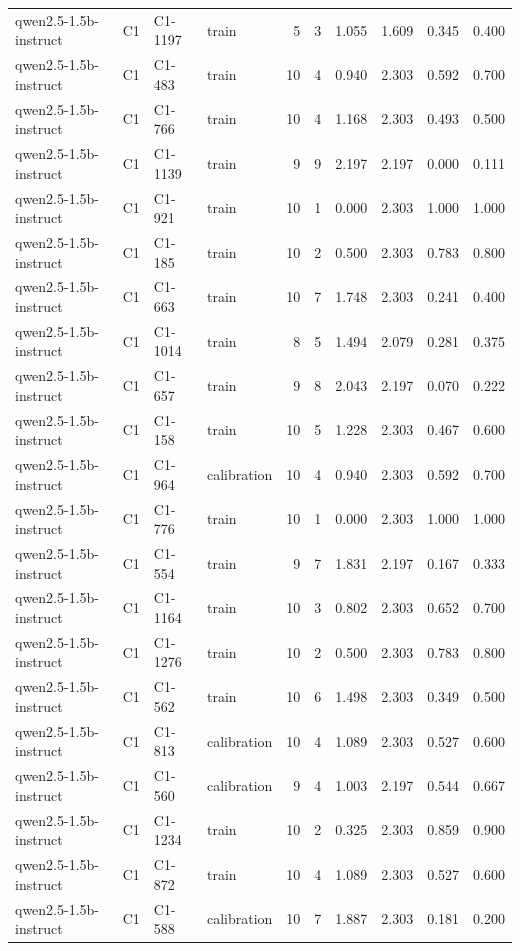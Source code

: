 \begin{table}
\begin{tabular}{llllrrrrrr}
qwen2.5-1.5b-instruct & C1 & C1-1197 & train & 5 & 3 & 1.055 & 1.609 & 0.345 & 0.400 \\
qwen2.5-1.5b-instruct & C1 & C1-483 & train & 10 & 4 & 0.940 & 2.303 & 0.592 & 0.700 \\
qwen2.5-1.5b-instruct & C1 & C1-766 & train & 10 & 4 & 1.168 & 2.303 & 0.493 & 0.500 \\
qwen2.5-1.5b-instruct & C1 & C1-1139 & train & 9 & 9 & 2.197 & 2.197 & 0.000 & 0.111 \\
qwen2.5-1.5b-instruct & C1 & C1-921 & train & 10 & 1 & 0.000 & 2.303 & 1.000 & 1.000 \\
qwen2.5-1.5b-instruct & C1 & C1-185 & train & 10 & 2 & 0.500 & 2.303 & 0.783 & 0.800 \\
qwen2.5-1.5b-instruct & C1 & C1-663 & train & 10 & 7 & 1.748 & 2.303 & 0.241 & 0.400 \\
qwen2.5-1.5b-instruct & C1 & C1-1014 & train & 8 & 5 & 1.494 & 2.079 & 0.281 & 0.375 \\
qwen2.5-1.5b-instruct & C1 & C1-657 & train & 9 & 8 & 2.043 & 2.197 & 0.070 & 0.222 \\
qwen2.5-1.5b-instruct & C1 & C1-158 & train & 10 & 5 & 1.228 & 2.303 & 0.467 & 0.600 \\
qwen2.5-1.5b-instruct & C1 & C1-964 & calibration & 10 & 4 & 0.940 & 2.303 & 0.592 & 0.700 \\
qwen2.5-1.5b-instruct & C1 & C1-776 & train & 10 & 1 & 0.000 & 2.303 & 1.000 & 1.000 \\
qwen2.5-1.5b-instruct & C1 & C1-554 & train & 9 & 7 & 1.831 & 2.197 & 0.167 & 0.333 \\
qwen2.5-1.5b-instruct & C1 & C1-1164 & train & 10 & 3 & 0.802 & 2.303 & 0.652 & 0.700 \\
qwen2.5-1.5b-instruct & C1 & C1-1276 & train & 10 & 2 & 0.500 & 2.303 & 0.783 & 0.800 \\
qwen2.5-1.5b-instruct & C1 & C1-562 & train & 10 & 6 & 1.498 & 2.303 & 0.349 & 0.500 \\
qwen2.5-1.5b-instruct & C1 & C1-813 & calibration & 10 & 4 & 1.089 & 2.303 & 0.527 & 0.600 \\
qwen2.5-1.5b-instruct & C1 & C1-560 & calibration & 9 & 4 & 1.003 & 2.197 & 0.544 & 0.667 \\
qwen2.5-1.5b-instruct & C1 & C1-1234 & train & 10 & 2 & 0.325 & 2.303 & 0.859 & 0.900 \\
qwen2.5-1.5b-instruct & C1 & C1-872 & train & 10 & 4 & 1.089 & 2.303 & 0.527 & 0.600 \\
qwen2.5-1.5b-instruct & C1 & C1-588 & calibration & 10 & 7 & 1.887 & 2.303 & 0.181 & 0.200 \\

\end{tabular}
\end{table}
